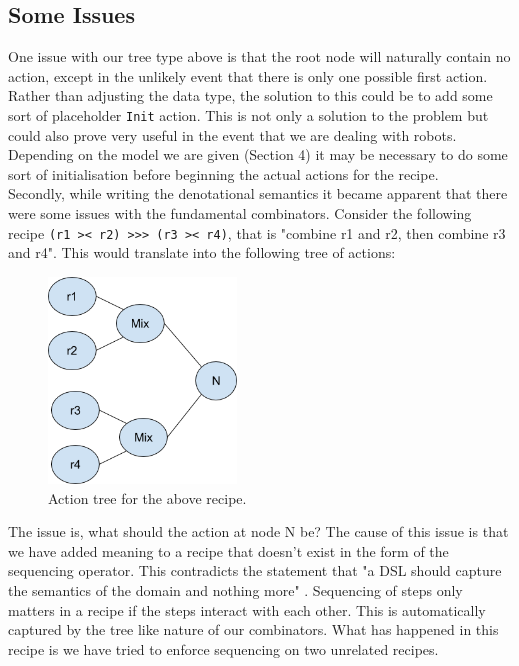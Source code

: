 \documentclass[11pt]{article}
\begin{document}
    \subsection{Some Issues}

    One issue with our tree type above is that the root node will naturally contain no action,
    except in the unlikely event that there is only one possible first action. Rather
    than adjusting the data type, the solution to this could be to add some sort of
    placeholder \texttt{Init} action. This is not only a solution to the problem but
    could also prove very useful in the event that we are dealing with robots. Depending
    on the model we are given (Section 4) it may be necessary to do some sort of
    initialisation before beginning the actual actions for the recipe. \\

    Secondly, while writing the denotational semantics it became apparent that there were
    some issues with the fundamental combinators. Consider the following recipe
    \texttt{(r1 >< r2) >>> (r3 >< r4)}, that is "combine r1 and r2, then combine
    r3 and r4". This would translate into the following tree of actions:

    \begin{figure}[ht]
        \centering
            \includegraphics[width=5cm,keepaspectratio]{issue1.png}
        \caption{Action tree for the above recipe.}
    \end{figure}

    The issue is, what should the action at node N be? The cause of this issue is
    that we have added meaning to a recipe that doesn't exist in the form of the sequencing
    operator. This contradicts the statement that "a DSL should capture the semantics of the
    domain and nothing more" \cite{hudak}. Sequencing of steps only matters in a recipe if
    the steps interact with each other. This is automatically captured by the tree like nature
    of our combinators. What has happened in this recipe is we have tried to enforce sequencing
    on two unrelated recipes. \\
\end{document}
